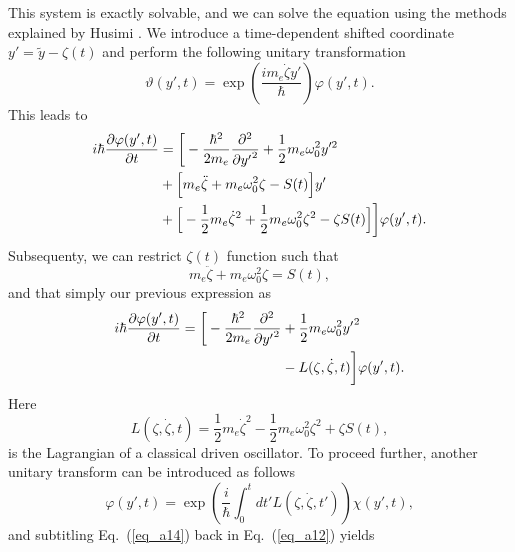 This system is exactly solvable, and we can solve the equation using the methods explained by Husimi \cite{husimi53}. We introduce a time-dependent shifted coordinate $ y' = \tilde{y} - \zeta(t)$ and perform the following unitary transformation
\begin{equation} \label{eq_a9}
    \vartheta(y',t) = \exp(\frac{im_e\dot{\zeta}y'}{\hbar})\varphi(y',t).
\end{equation}
This leads to
\begin{equation} \label{eq_a10}
  \begin{aligned}
    i \hbar \pdv{\varphi(y',t)}{t}   &=
    \bigg[
        -  \frac{\hbar^2}{2m_e}\pdv[2]{{y'}}
        + \frac{1}{2} m_e \omega_0^2 y'^2 \\
        & +
        \Big[
            m_e\ddot{\zeta} + m_e\omega_0^2\zeta - S(t)
        \Big]y' \\
        &
        +
        \Big[
            - \frac{1}{2} m_e\dot{\zeta}^2 + \frac{1}{2}m_e\omega_0^2 \zeta^2 - \zeta S(t)
        \Big]
    \bigg]\varphi(y',t).
  \end{aligned}
\end{equation}
Subsequenty, we can restrict $\zeta(t)$ function such that
\begin{equation} \label{eq_a11}
  m_e\ddot{\zeta} + m_e\omega_0^2\zeta = S(t),
\end{equation}
and that simply our previous expression as
\begin{equation} \label{eq_a12}
  \begin{aligned}
    i \hbar \pdv{\varphi(y',t)}{t}   =
    \bigg[
        -  \frac{\hbar^2}{2m_e}\pdv[2]{{y'}} &
        + \frac{1}{2} m_e \omega_0^2 {y'}^2 \\
        &
        - L(\zeta,\dot{\zeta},t)
    \bigg]\varphi(y',t).
  \end{aligned}
\end{equation}
Here
\begin{equation} \label{eq_a13}
  L(\zeta,\dot{\zeta},t) = \frac{1}{2} m_e\dot{\zeta}^2 - \frac{1}{2}m_e\omega_0^2 \zeta^2 + \zeta S(t),
\end{equation}
is the Lagrangian of a classical driven oscillator. To proceed further, another unitary transform can be introduced as follows
\begin{equation} \label{eq_a14}
    \varphi(y',t) = \exp(\frac{i}{\hbar}\int_0^{t}dt'L(\zeta,\dot{\zeta},t')) \chi(y',t),
\end{equation}
and subtitling Eq.~(\ref{eq_a14}) back in Eq.~(\ref{eq_a12}) yields
